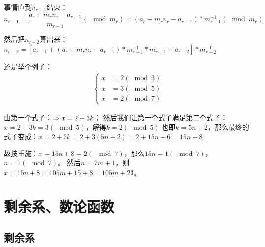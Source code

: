 \documentclass[12pt]{article}
\begin{document}
事情直到$n_{r-1}$结束：$n_{r-1}=\dfrac{a_{r}+m_{r}n_{r}-a_{r-1}}{m_{r-1}} (\mod m_{r})=(a_{r}+m_{r}n_{r}-a_{r-1})*m^{-1}_{r-1} (\mod m_{r})$

然后把$n_{r-2}$算出来：$n_{r-2}=[a_{r-1}+(a_{r}+m_{r}n_{r}-a_{r-1})*m^{-1}_{r-1}*m_{r-1}-a_{r-2}]*m^{-1}_{r-2}$


还是举个例子：
\begin{align*}
    \begin{cases}
        x&=2(\mod 3)\\
        x&=3(\mod 5)\\
        x&=2(\mod 7)
    \end{cases}
\end{align*}

由第一个式子：$\Rightarrow x = 2+3k\\$；
然后我们让第一个式子满足第二个式子：$x = 2+3k=3 (\mod 5)$，解得$k=2(\mod 5)$
也即$k=5n+2$，那么最终的式子变成：$x = 2+3k = 2+3(5n+2)=2+15n+6=15n+8$

故技重施：$x=15n+8=2(\mod 7)$，那么$15n=1(\mod 7)$，$n=1(\mod 7)$。
然后$n=7m+1$，则$x=15n+8=105m+15+8=105m+23$。

\section{剩余系、数论函数}

\subsection{剩余系}
\end{document}
